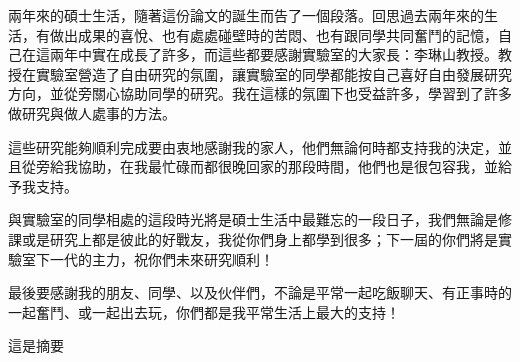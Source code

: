\NTUtitlepage  %

\newpage
\setcounter{page}{1}

\NTUoralpage  %

\mydoublespacing
\begin{acknowledgement} %
兩年來的碩士生活，隨著這份論文的誕生而告了一個段落。回思過去兩年來的生活，有做出成果的喜悅、也有處處碰壁時的苦悶、也有跟同學共同奮鬥的記憶，自己在這兩年中實在成長了許多，而這些都要感謝實驗室的大家長：李琳山教授。教授在實驗室營造了自由研究的氛圍，讓實驗室的同學都能按自己喜好自由發展研究方向，並從旁關心協助同學的研究。我在這樣的氛圍下也受益許多，學習到了許多做研究與做人處事的方法。

這些研究能夠順利完成要由衷地感謝我的家人，他們無論何時都支持我的決定，並且從旁給我協助，在我最忙碌而都很晚回家的那段時間，他們也是很包容我，並給予我支持。

與實驗室的同學相處的這段時光將是碩士生活中最難忘的一段日子，我們無論是修課或是研究上都是彼此的好戰友，我從你們身上都學到很多；下一屆的你們將是實驗室下一代的主力，祝你們未來研究順利！

最後要感謝我的朋友、同學、以及伙伴們，不論是平常一起吃飯聊天、有正事時的一起奮鬥、或一起出去玩，你們都是我平常生活上最大的支持！

\end{acknowledgement}

\begin{zhAbstract}  %
這是摘要

\end{zhAbstract}

{
\mysinglespacing\selectfont
\tableofcontents %

\listoffigures  %

\listoftables  %
\par
}

\newpage
\setcounter{page}{1}
